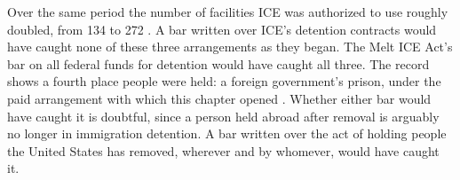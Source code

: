 Over the same period the number of facilities ICE was authorized to use roughly doubled, from 134 to 272 \autocite{gao2026detention}. A bar written over ICE's detention contracts would have caught none of these three arrangements as they began. The Melt ICE Act's bar on all federal funds for detention would have caught all three. The record shows a fourth place people were held: a foreign government's prison, under the paid arrangement with which this chapter opened \autocite{Renteria2025ElSalvador}. Whether either bar would have caught it is doubtful, since a person held abroad after removal is arguably no longer in immigration detention. A bar written over the act of holding people the United States has removed, wherever and by whomever, would have caught it.
